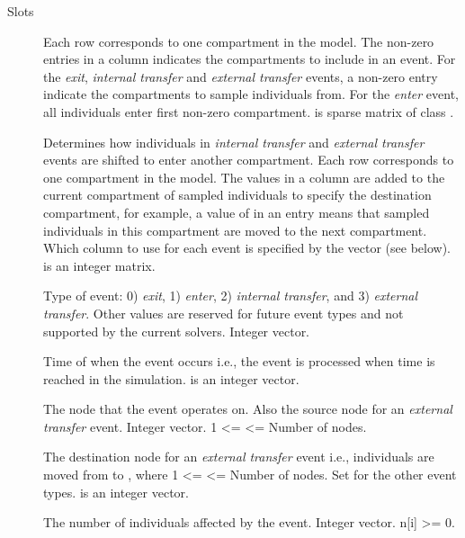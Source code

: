 \documentclass[letterpaper]{book}
\begin{document}
%
\begin{Section}{Slots}

\begin{description}

\item[] Each row corresponds to one compartment in the model. The
non-zero entries in a column indicates the compartments to
include in an event.  For the \emph{exit}, \emph{internal
transfer} and \emph{external transfer} events, a non-zero
entry indicate the compartments to sample individuals from.
For the \emph{enter} event, all individuals enter first
non-zero compartment.  is sparse matrix of class
.

\item[] Determines how individuals in \emph{internal transfer} and
\emph{external transfer} events are shifted to enter another
compartment.  Each row corresponds to one compartment in the
model.  The values in a column are added to the current
compartment of sampled individuals to specify the destination
compartment, for example, a value of  in an entry
means that sampled individuals in this compartment are moved
to the next compartment.  Which column to use for each event
is specified by the  vector (see below).  
is an integer matrix.

\item[] Type of event: 0) \emph{exit}, 1) \emph{enter}, 2)
\emph{internal transfer}, and 3) \emph{external transfer}.
Other values are reserved for future event types and not
supported by the current solvers. Integer vector.

\item[] Time of when the event occurs i.e., the event is
processed when time is reached in the simulation.  
is an integer vector.

\item[] The node that the event operates on. Also the source
node for an \emph{external transfer} event.  Integer vector.
1 <=  <= Number of nodes.

\item[] The destination node for an \emph{external transfer}
event i.e., individuals are moved from  to
, where 1 <=  <= Number of nodes.
Set  for the other event types.  
is an integer vector.

\item[] The number of individuals affected by the event. Integer
vector.  n[i] >= 0.


\end{description}
\end{Section}
\end{document}
